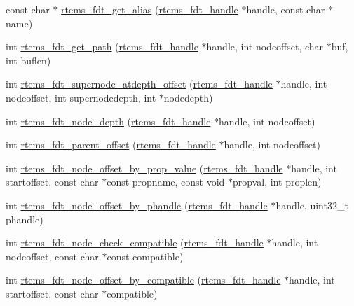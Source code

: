 \begin{DoxyCompactItemize}
\item 
const char $\ast$ \mbox{\hyperlink{rtems-fdt_8h_af220698849e74aac90bea92864e5d628}{rtems\+\_\+fdt\+\_\+get\+\_\+alias}} (\mbox{\hyperlink{structrtems__fdt__handle}{rtems\+\_\+fdt\+\_\+handle}} $\ast$handle, const char $\ast$name)
\item 
int \mbox{\hyperlink{rtems-fdt_8h_afcdb3310c5a54e1f954e30a16af3dc6a}{rtems\+\_\+fdt\+\_\+get\+\_\+path}} (\mbox{\hyperlink{structrtems__fdt__handle}{rtems\+\_\+fdt\+\_\+handle}} $\ast$handle, int nodeoffset, char $\ast$buf, int buflen)
\item 
int \mbox{\hyperlink{rtems-fdt_8h_a20478964d261bd15846a70f3d8af55ab}{rtems\+\_\+fdt\+\_\+supernode\+\_\+atdepth\+\_\+offset}} (\mbox{\hyperlink{structrtems__fdt__handle}{rtems\+\_\+fdt\+\_\+handle}} $\ast$handle, int nodeoffset, int supernodedepth, int $\ast$nodedepth)
\item 
int \mbox{\hyperlink{rtems-fdt_8h_a9ec16b9548b07b98f9d88e2e7a6f62cc}{rtems\+\_\+fdt\+\_\+node\+\_\+depth}} (\mbox{\hyperlink{structrtems__fdt__handle}{rtems\+\_\+fdt\+\_\+handle}} $\ast$handle, int nodeoffset)
\item 
int \mbox{\hyperlink{rtems-fdt_8h_a99132e68dc89a9345760db5f986e26be}{rtems\+\_\+fdt\+\_\+parent\+\_\+offset}} (\mbox{\hyperlink{structrtems__fdt__handle}{rtems\+\_\+fdt\+\_\+handle}} $\ast$handle, int nodeoffset)
\item 
int \mbox{\hyperlink{rtems-fdt_8h_acc37bcb0ea7b3d2a6f1c9bb9369305c4}{rtems\+\_\+fdt\+\_\+node\+\_\+offset\+\_\+by\+\_\+prop\+\_\+value}} (\mbox{\hyperlink{structrtems__fdt__handle}{rtems\+\_\+fdt\+\_\+handle}} $\ast$handle, int startoffset, const char $\ast$const propname, const void $\ast$propval, int proplen)
\item 
int \mbox{\hyperlink{rtems-fdt_8h_a0e325bcc41668532f9d4fdc6d66d5fb6}{rtems\+\_\+fdt\+\_\+node\+\_\+offset\+\_\+by\+\_\+phandle}} (\mbox{\hyperlink{structrtems__fdt__handle}{rtems\+\_\+fdt\+\_\+handle}} $\ast$handle, uint32\+\_\+t phandle)
\item 
int \mbox{\hyperlink{rtems-fdt_8h_a6abac9c2c215d99055a4f0c85c831ba1}{rtems\+\_\+fdt\+\_\+node\+\_\+check\+\_\+compatible}} (\mbox{\hyperlink{structrtems__fdt__handle}{rtems\+\_\+fdt\+\_\+handle}} $\ast$handle, int nodeoffset, const char $\ast$const compatible)
\item 
int \mbox{\hyperlink{rtems-fdt_8h_abe269c0fdda9a30c153f87b507c9a1f3}{rtems\+\_\+fdt\+\_\+node\+\_\+offset\+\_\+by\+\_\+compatible}} (\mbox{\hyperlink{structrtems__fdt__handle}{rtems\+\_\+fdt\+\_\+handle}} $\ast$handle, int startoffset, const char $\ast$compatible)

\end{DoxyCompactItemize}
